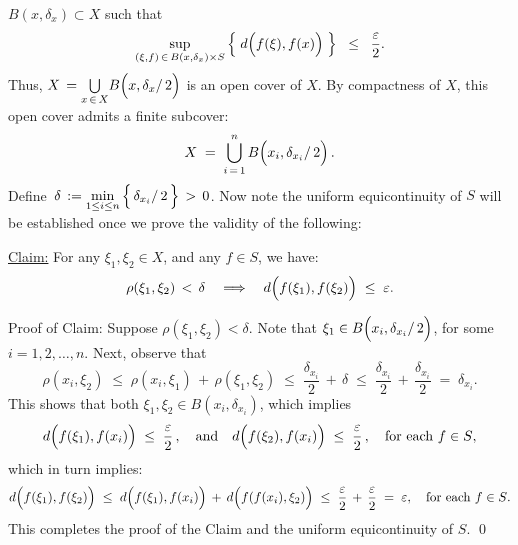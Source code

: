 \begin{enumerate}
	$B(x,\delta_{x}) \subset X$ such that
	\begin{equation*}
	\sup_{(\xi,f) \,\in\, B(x,\delta_{x}) \times S}\left\{\;d\!\left(\overset{{\color{white}.}}{f}(\xi),f(x)\right)\;\right\}
	\;\;\leq\;\;
	\dfrac{\varepsilon}{2}.
	\end{equation*}
	Thus, $X \, = \underset{x\,\in\,X}{\bigcup}B\!\left(x,\delta_{x}\overset{{\color{white}.}}{/}\,2\right)$ is an open cover of $X$.
	By compactness of $X$, this open cover admits a finite subcover:
	\begin{equation*}
	X \; = \; \overset{n}{\underset{i\,=\,1}{\bigcup}}\,B\!\left(x_{i},\delta_{x_{i}}\overset{{\color{white}.}}{/}\,2\right).
	\end{equation*}
	Define \,$\delta \,:= \underset{1\leq i \leq n}{\min}\left\{\,\delta_{x_{i}}\overset{{\color{white}.}}{/}\,2\,\right\} \,>\, 0$.
	Now note the uniform equicontinuity of $S$ will be established once we
	prove the validity of the following:
	\begin{center}
	\begin{minipage}{5.5in}
	\noindent
	\underline{Claim:} \quad For any $\xi_{1}, \xi_{2} \in X$, and any $f \in S$, we have:
	\begin{equation*}
	\rho(\xi_{1},\xi_{2}) \,<\, \delta
	\quad\Longrightarrow\quad
	d\!\left(\overset{{\color{white}.}}{f}(\xi_{1}),f(\xi_{2})\right) \;\leq\; \varepsilon.
	\end{equation*}
	\end{minipage}
	\end{center}
	Proof of Claim: \quad Suppose $\rho(\xi_{1},\xi_{2}) < \delta$.
	Note that $\xi_{1} \in B\!\left(x_{i},\delta_{x_{i}}\overset{{\color{white}.}}{/}\,2\right)$,
	for some $i = 1, 2, \ldots, n$.
	Next, observe that
	\begin{equation*}
	\rho(x_{i},\xi_{2})
	\;\leq\; \rho(x_{i},\xi_{1}) \,+\, \rho(\xi_{1},\xi_{2})
	\;\leq\; \dfrac{\delta_{x_{i}}}{2} \,+\, \delta
	\;\leq\; \dfrac{\delta_{x_{i}}}{2} \,+\, \dfrac{\delta_{x_{i}}}{2}
	\;=\; \delta_{x_{i}}.
	\end{equation*}
	This shows that both $\xi_{1}, \xi_{2} \in B(x_{i},\delta_{x_{i}})$, which implies
	\begin{equation*}
	d\!\left(\overset{{\color{white}.}}{f}(\xi_{1}),f(x_{i})\right) \;\leq\; \dfrac{\varepsilon}{2}\,,
	\quad\textnormal{and}\quad
	d\!\left(\overset{{\color{white}.}}{f}(\xi_{2}),f(x_{i})\right) \;\leq\; \dfrac{\varepsilon}{2}\,,
	\quad\textnormal{for each $f \in S$},
	\end{equation*}
	which in turn implies:
	\begin{equation*}
	d\!\left(\overset{{\color{white}.}}{f}(\xi_{1}),f(\xi_{2})\right)
	\;\leq\; d\!\left(\overset{{\color{white}.}}{f}(\xi_{1}),f(x_{i})\right)
		\,+\, d\!\left(\overset{{\color{white}.}}{f}(f(x_{i}),\xi_{2})\right)
	\;\leq\; \dfrac{\varepsilon}{2} \,+\, \dfrac{\varepsilon}{2}
	\;=\; \varepsilon,
	\quad\textnormal{for each $f \in S$}.
	\end{equation*}
	This completes the proof of the Claim and the uniform equicontinuity of $S$.
	\qed
\end{enumerate}

